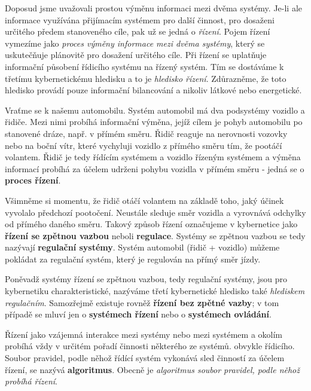       Doposud jsme uvažovali prostou výměnu informaci mezi dvěma systémy. Je-li ale informace 
      využívána přijímacím systémem pro další činnost, pro dosaženi určitého předem stanoveného 
      cíle, pak už se jedná o \emph{řízení}. Pojem řízení vymezíme jako \emph{proces výměny 
      informace mezi dvěma systémy}, který se uskutečňuje plánovitě pro dosažení určitého cíle. Při 
      řízení se uplatňuje informační působení řídicího systému na řízený systém. Tím se dostáváme k 
      třetímu kybernetickému hledisku a to je \emph{hledisko řízení}. Zdůrazněme, že toto hledisko 
      provádí pouze informační bilancování a nikoliv látkové nebo energetické.
      
      Vraťme se k našemu automobilu. Systém automobil má dva podsystémy vozidlo a řidiče. Mezi nimi 
      probíhá informační výměna, jejíž cílem je pohyb automobilu po stanovené dráze, např. v přímém 
      směru. Řidič reaguje na nerovnosti vozovky nebo na boční vítr, které vychyluji vozidlo z 
      přímého směru tím, že pootáčí volantem. Řidič je tedy řídícím systémem a vozidlo řízeným 
      systémem a výměna informací probíhá za účelem udrženi pohybu vozidla v přímém směru - jedná 
      se o \textbf{proces řízení}.
      
      Všimněme si momentu, že řidič otáčí volantem na základě toho, jaký účinek vyvolalo předchozí 
      pootočení. Neustále sleduje směr vozidla a vyrovnává odchylky od přímého daného směru. Takový 
      způsob řízení označujeme v kybernetice jako \textbf{řízení se zpětnou vazbou} neboli 
      \textbf{regulace}. Systémy se zpětnou vazbou se tedy nazývají \textbf{regulační systémy}. 
      Systém automobil (řidič + vozidlo) můžeme pokládat za regulační systém, který je regulován na 
      přímý směr jízdy.
      
      Poněvadž systémy řízení se zpětnou vazbou, tedy regulační systémy, jsou pro kybernetiku 
      charakteristické, nazýváme třetí kybernetické hledisko také \emph{hlediskem regulačním}. 
      Samozřejmě existuje rovněž \textbf{řízení bez zpětné vazby}; v tom případě se mluví jen o 
      \textbf{systémech řízení} nebo o \textbf{systémech ovládání}.
      
      Řízení jako vzájemná interakce mezi systémy nebo mezi systémem a okolím probíhá vždy v 
      určitém pořadí činnosti některého ze systémů. obvykle řídicího. Soubor pravidel, podle něhož 
      řídící systém vykonává sled činností za účelem řízení, se nazývá \textbf{algoritmus}. Obecně 
      je \emph{algoritmus soubor pravidel, podle něhož probíhá řízení}.
      
